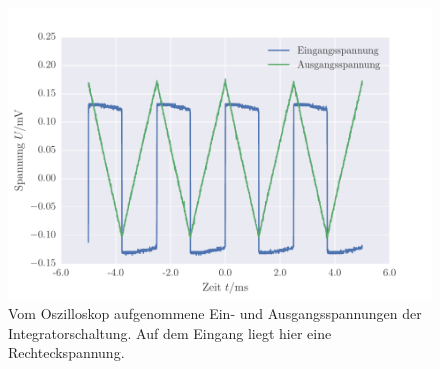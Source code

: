 \FloatBarrier
\begin{figure}[!h]
\centering
\includegraphics[scale=1]{../Grafiken/Integrator_Oszilloskop_Rechteck.pdf}
\caption{Vom Oszilloskop aufgenommene Ein- und Ausgangsspannungen der Integratorschaltung. Auf dem Eingang
	liegt hier eine Rechteckspannung.\label{fig:integrator_oszilloskop_rechteck}}
\end{figure}
\FloatBarrier